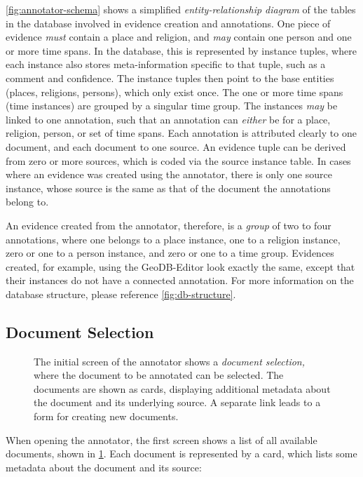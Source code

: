 \cref{fig:annotator-schema} shows a simplified \emph{entity-relationship diagram} of the tables in the database involved in evidence creation and annotations.
One piece of evidence \emph{must} contain a place and religion, and \emph{may} contain one person and one or more time spans.
In the database, this is represented by instance tuples, where each instance also stores meta-information specific to that tuple, such as a comment and confidence.
The instance tuples then point to the base entities (places, religions, persons), which only exist once.
The one or more time spans (time instances) are grouped by a singular time group.
The instances \emph{may} be linked to one annotation, such that an annotation can \emph{either} be for a place, religion, person, or set of time spans.
Each annotation is attributed clearly to one document, and each document to one source.
An evidence tuple can be derived from zero or more sources, which is coded via the source instance table.
In cases where an evidence was created using the annotator, there is only one source instance, whose source is the same as that of the document the annotations belong to.

An evidence created from the annotator, therefore, is a \emph{group} of two to four annotations, where one belongs to a place instance, one to a religion instance, zero or one to a person instance, and zero or one to a time group.
Evidences created, for example, using the GeoDB-Editor look exactly the same, except that their instances do not have a connected annotation.
For more information on the database structure, please reference \cref{fig:db-structure}.


\subsection{Document Selection}
\label{sec:document-selection}

\begin{figure}[htb]

  \caption{
    The initial screen of the annotator shows a \emph{document selection,} where the document to be annotated can be selected.
    The documents are shown as cards, displaying additional metadata about the document and its underlying source.
    A separate link leads to a form for creating new documents.
  }
  \label{fig:document-selection}
\end{figure}

When opening the annotator, the first screen shows a list of all available documents, shown in \cref{fig:document-selection}.
Each document is represented by a card, which lists some metadata about the document and its source:

